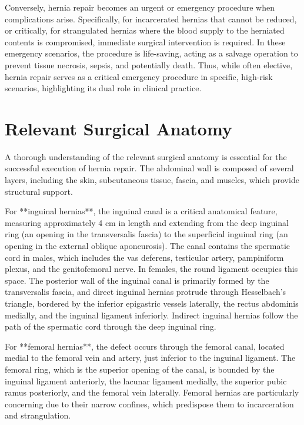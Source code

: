 Conversely, hernia repair becomes an urgent or emergency procedure when complications arise. Specifically, for incarcerated hernias that cannot be reduced, or critically, for strangulated hernias where the blood supply to the herniated contents is compromised, immediate surgical intervention is required. In these emergency scenarios, the procedure is life-saving, acting as a salvage operation to prevent tissue necrosis, sepsis, and potentially death. Thus, while often elective, hernia repair serves as a critical emergency procedure in specific, high-risk scenarios, highlighting its dual role in clinical practice.

\section*{Relevant Surgical Anatomy}
A thorough understanding of the relevant surgical anatomy is essential for the successful execution of hernia repair. The abdominal wall is composed of several layers, including the skin, subcutaneous tissue, fascia, and muscles, which provide structural support. 

For **inguinal hernias**, the inguinal canal is a critical anatomical feature, measuring approximately 4 cm in length and extending from the deep inguinal ring (an opening in the transversalis fascia) to the superficial inguinal ring (an opening in the external oblique aponeurosis). The canal contains the spermatic cord in males, which includes the vas deferens, testicular artery, pampiniform plexus, and the genitofemoral nerve. In females, the round ligament occupies this space. The posterior wall of the inguinal canal is primarily formed by the transversalis fascia, and direct inguinal hernias protrude through Hesselbach's triangle, bordered by the inferior epigastric vessels laterally, the rectus abdominis medially, and the inguinal ligament inferiorly. Indirect inguinal hernias follow the path of the spermatic cord through the deep inguinal ring.

For **femoral hernias**, the defect occurs through the femoral canal, located medial to the femoral vein and artery, just inferior to the inguinal ligament. The femoral ring, which is the superior opening of the canal, is bounded by the inguinal ligament anteriorly, the lacunar ligament medially, the superior pubic ramus posteriorly, and the femoral vein laterally. Femoral hernias are particularly concerning due to their narrow confines, which predispose them to incarceration and strangulation.

